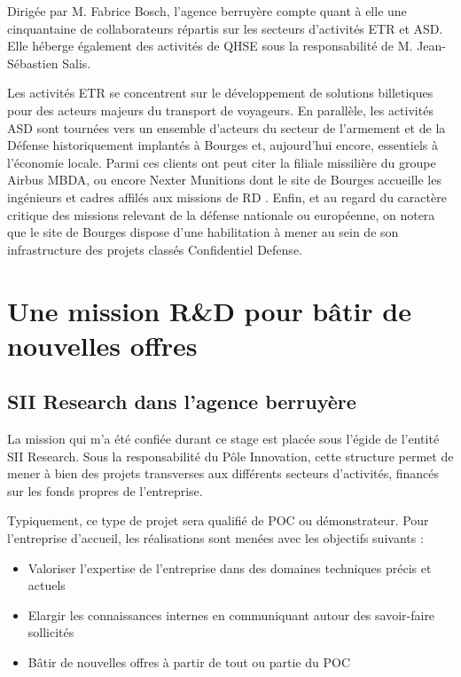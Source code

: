 Dirigée par M. Fabrice Bosch, l'agence berruyère compte quant à elle une cinquantaine de collaborateurs répartis sur les secteurs d'activités \gls{ETR} et \gls{ASD}. 
Elle héberge également des activités de \gls{QHSE} sous la responsabilité de M. Jean-Sébastien Salis.  

Les activités \gls{ETR} se concentrent sur le développement de solutions billetiques pour des acteurs majeurs du transport de voyageurs. 
En parallèle, les activités \gls{ASD} sont tournées vers un ensemble d'acteurs du secteur de l'armement et de la Défense historiquement implantés à Bourges et, aujourd'hui encore, essentiels à l'économie locale\cite{Bib_def_cher}. 
Parmi ces clients ont peut citer la filiale missilière du groupe Airbus MBDA, ou encore Nexter Munitions dont le site de Bourges accueille les ingénieurs et cadres affilés aux missions de \gls{RD} . 
Enfin, et au regard du caractère critique des missions relevant de la défense nationale ou européenne, on notera que le site de Bourges dispose d'une habilitation à mener au sein de son infrastructure des projets classés Confidentiel
Defense. 

\section{Une mission R\&D pour b\^{a}tir de nouvelles offres}

\subsection{SII Research dans l'agence berruyère}

La mission qui m'a été confiée durant ce stage est placée sous l'égide de l'entité SII Research. 
Sous la responsabilité du Pôle Innovation, cette structure permet de mener à bien des projets transverses aux différents secteurs d'activités, financés sur les fonds propres de l'entreprise.  

Typiquement, ce type de projet sera qualifié de \gls{POC} ou démonstrateur. Pour l'entreprise d'accueil, les réalisations sont menées avec les objectifs suivants : 

\begin{itemize}
  \item Valoriser l'expertise de l'entreprise dans des domaines techniques précis et actuels
  \item Elargir les connaissances internes en communiquant autour des savoir-faire sollicités
  \item Bâtir de nouvelles offres à partir de tout ou partie du \gls{POC} 
\end{itemize}


